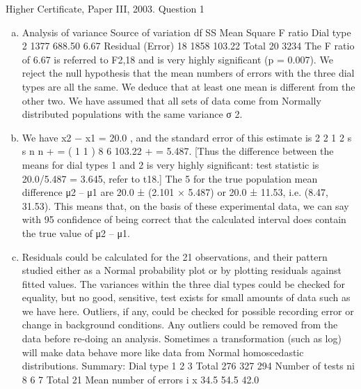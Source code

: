 \documentclass[a4paper,12pt]{article}
\begin{document}
Higher Certificate, Paper III, 2003. Question 1
\begin{enumerate}[(a)]
\item Analysis of variance
Source of variation df SS Mean Square F ratio
Dial type 2 1377 688.50 6.67
Residual (Error) 18 1858 103.22
Total 20 3234
The F ratio of 6.67 is referred to F2,18 and is very highly significant (p =
0.007). We reject the null hypothesis that the mean numbers of errors with the
three dial types are all the same. We deduce that at least one mean is different
from the other two.
We have assumed that all sets of data come from Normally distributed
populations with the same variance σ 2.
\item We have x2 − x1 = 20.0 , and the standard error of this estimate is
2 2
1 2
s s
n n
+
= ( 1 1 )
8 6 103.22 + = 5.487. [Thus the difference between the means for dial
types 1 and 2 is very highly significant: test statistic is 20.0/5.487 = 3.645,
refer to t18.] The 5%
for the true population mean difference μ2 – μ1 are
20.0 ± (2.101 × 5.487) or 20.0 ± 11.53, i.e. (8.47, 31.53).
This means that, on the basis of these experimental data, we can say with 95%
confidence of being correct that the calculated interval does contain the true
value of μ2 – μ1.

\item Residuals could be calculated for the 21 observations, and their pattern studied
either as a Normal probability plot or by plotting residuals against fitted
values.
The variances within the three dial types could be checked for equality, but no
good, sensitive, test exists for small amounts of data such as we have here.
Outliers, if any, could be checked for possible recording error or change in
background conditions. Any outliers could be removed from the data before
re-doing an analysis.
Sometimes a transformation (such as log) will make data behave more like
data from Normal homoscedastic distributions.
Summary: Dial type 1 2 3
Total 276 327 294
Number of tests ni 8 6 7 Total 21
Mean number of errors i x 34.5 54.5 42.0
\end{enumerate}
\end{document}
